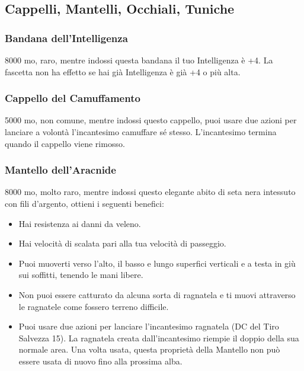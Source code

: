 \begin{multicols}{2}
\subsection{Cappelli, Mantelli, Occhiali, Tuniche}


\subsubsection*{Bandana dell'Intelligenza}
8000 mo, raro, mentre indossi questa bandana il tuo Intelligenza è +4. La fascetta non ha effetto se hai già Intelligenza è già +4 o più alta.

\subsubsection*{Cappello del Camuffamento}
5000 mo, non comune, mentre indossi questo cappello, puoi usare due azioni per lanciare a volontà l'incantesimo camuffare sé stesso. L'incantesimo termina quando il cappello viene rimosso.

\subsubsection*{Mantello dell'Aracnide}
8000 mo, molto raro, mentre indossi questo elegante abito di seta nera intessuto con fili d'argento, ottieni i seguenti benefici:

\medskip

\begin{itemize}
\item
Hai resistenza ai danni da veleno.
\item
Hai velocità di scalata pari alla tua velocità di passeggio.
\item
Puoi muoverti verso l'alto, il basso e lungo superfici verticali e a testa in giù sui soffitti, tenendo le mani libere.
\item
Non puoi essere catturato da alcuna sorta di ragnatela e ti muovi attraverso le ragnatele come fossero terreno difficile.
\item
Puoi usare due azioni per lanciare l'incantesimo ragnatela (DC del Tiro Salvezza 15). La ragnatela creata dall'incantesimo riempie il doppio della sua normale area. Una volta usata, questa proprietà della Mantello non può essere usata di nuovo fino alla prossima alba.
\end{itemize}


\end{multicols}
